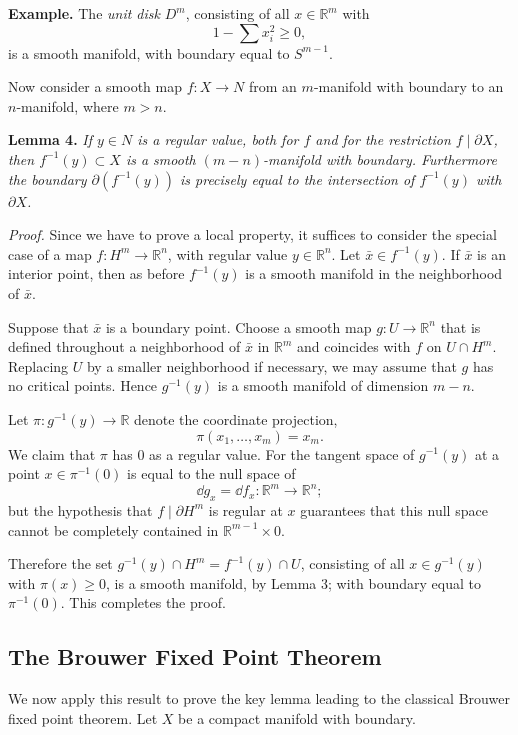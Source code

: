 
\noindent\textbf{Example.} The \emph{unit disk} $D^m$, consisting of all $x \in \mathbb{R}^m$ with
\[
1 - \sum x_i^2 \geq 0,
\]
is a smooth manifold, with boundary equal to $S^{m-1}$.

Now consider a smooth map $f : X \to N$ from an $m$-manifold with boundary to an $n$-manifold, where $m > n$.

\noindent\textbf{Lemma 4.} \textit{If $y \in N$ is a regular value, both for $f$ and for the restriction $f \mid \partial X$, then $f^{-1}(y) \subset X$ is a smooth $(m-n)$-manifold with boundary. Furthermore the boundary $\partial(f^{-1}(y))$ is precisely equal to the intersection of $f^{-1}(y)$ with $\partial X$.}

\noindent\textit{Proof.} Since we have to prove a local property, it suffices to consider the special case of a map $f : H^m \to \mathbb{R}^n$, with regular value $y \in \mathbb{R}^n$. Let $\bar{x} \in f^{-1}(y)$. If $\bar{x}$ is an interior point, then as before $f^{-1}(y)$ is a smooth manifold in the neighborhood of $\bar{x}$.

Suppose that $\bar{x}$ is a boundary point. Choose a smooth map $g : U \to \mathbb{R}^n$ that is defined throughout a neighborhood of $\bar{x}$ in $\mathbb{R}^m$ and coincides with $f$ on $U \cap H^m$. Replacing $U$ by a smaller neighborhood if necessary, we may assume that $g$ has no critical points. Hence $g^{-1}(y)$ is a smooth manifold of dimension $m - n$.

Let $\pi : g^{-1}(y) \to \mathbb{R}$ denote the coordinate projection,
\[
\pi(x_1, \ldots, x_m) = x_m.
\]
We claim that $\pi$ has $0$ as a regular value. For the tangent space of $g^{-1}(y)$ at a point $x \in \pi^{-1}(0)$ is equal to the null space of
\[
\dd g_x = \dd f_x : \mathbb{R}^m \to \mathbb{R}^n;
\]
but the hypothesis that $f \mid \partial H^m$ is regular at $x$ guarantees that this null space cannot be completely contained in $\mathbb{R}^{m-1} \times 0$.

Therefore the set $g^{-1}(y) \cap H^m = f^{-1}(y) \cap U$, consisting of all $x \in g^{-1}(y)$ with $\pi(x) \geq 0$, is a smooth manifold, by Lemma 3; with boundary equal to $\pi^{-1}(0)$. This completes the proof.

\subsection{The Brouwer Fixed Point Theorem}

We now apply this result to prove the key lemma leading to the classical Brouwer fixed point theorem. Let $X$ be a compact manifold with boundary.


